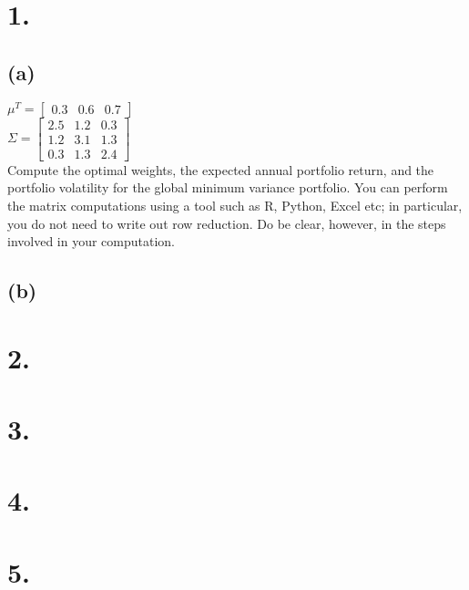 \documentclass{article}
\begin{document}
\thispagestyle{firstpageheader}

\section*{1.}


{\Large 

\subsection*{(a)}

$\mu^T = 
\begin{bmatrix}
  0.3 & 0.6 & 0.7
\end{bmatrix}$ \\
$ \Sigma = 
\begin{bmatrix}
2.5 & 1.2 & 0.3 \\
1.2 & 3.1 & 1.3 \\
0.3 & 1.3 & 2.4
\end{bmatrix}$ \\ 

Compute the optimal weights, the expected annual portfolio return, and the portfolio volatility for the global minimum variance portfolio. You can perform the matrix computations using a tool such as R, Python, Excel etc; in particular, you do not need to write out row reduction. Do be clear, however, in the steps involved in your computation.

\subsection*{(b)}

}

\section*{2.}
{\Large



}

\section*{3.}
{\Large 



}

\section*{4.}
{\Large 



}

\section*{5.}
{\Large 



}
\end{document}
